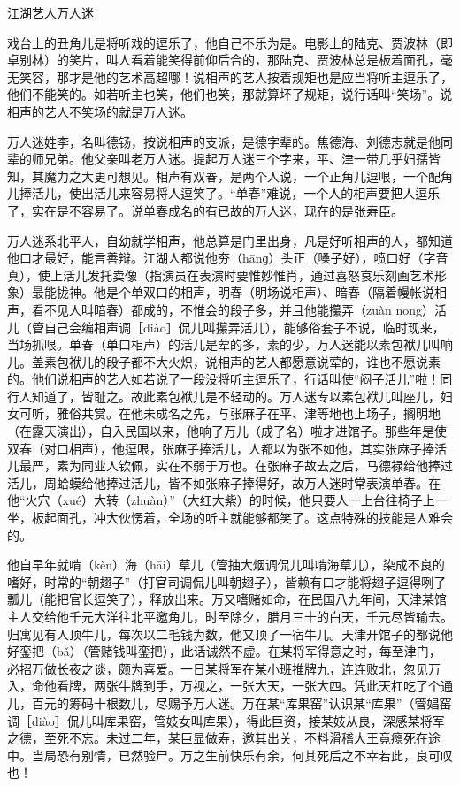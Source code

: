 \documentclass[12pt,UTF8]{ctexbook}
\begin{document}
江湖艺人万人迷


戏台上的丑角儿是将听戏的逗乐了，他自己不乐为是。电影上的陆克、贾波林（即卓别林）的笑片，叫人看着能笑得前仰后合的，那陆克、贾波林总是板着面孔，毫无笑容，那才是他的艺术高超哪！说相声的艺人按着规矩也是应当将听主逗乐了，他们不能笑的。如若听主也笑，他们也笑，那就算坏了规矩，说行话叫“笑场”。说相声的艺人不笑场的就是万人迷。

万人迷姓李，名叫德钖，按说相声的支派，是德字辈的。焦德海、刘德志就是他同辈的师兄弟。他父亲叫老万人迷。提起万人迷三个字来，平、津一带几乎妇孺皆知，其魔力之大更可想见。相声有双春，是两个人说，一个正角儿逗哏，一个配角儿捧活儿，使出活儿来容易将人逗笑了。“单春”难说，一个人的相声要把人逗乐了，实在是不容易了。说单春成名的有已故的万人迷，现在的是张寿臣。

万人迷系北平人，自幼就学相声，他总算是门里出身，凡是好听相声的人，都知道他口才最好，能言善辩。江湖人都说他夯（hānɡ）头正（嗓子好），喷口好（字音真），使上活儿发托卖像（指演员在表演时要惟妙惟肖，通过喜怒哀乐刻画艺术形象）最能拢神。他是个单双口的相声，明春（明场说相声）、暗春（隔着幔帐说相声，看不见人叫暗春）都成的，不惟会的段子多，并且他能攥弄（zuàn nong）活儿（管自己会编相声调［diào］侃儿叫攥弄活儿），能够俗套子不说，临时现来，当场抓哏。单春（单口相声）的活儿是荤的多，素的少，万人迷能以素包袱儿叫响儿。盖素包袱儿的段子都不大火炽，说相声的艺人都愿意说荤的，谁也不愿说素的。他们说相声的艺人如若说了一段没将听主逗乐了，行话叫使“闷子活儿”啦！同行人知道了，皆耻之。故此素包袱儿是不轻动的。万人迷专以素包袱儿叫座儿，妇女可听，雅俗共赏。在他未成名之先，与张麻子在平、津等地也上场子，搁明地（在露天演出），自入民国以来，他响了万儿（成了名）啦才进馆子。那些年是使双春（对口相声），他逗哏，张麻子捧活儿，人都以为张不如他，其实张麻子捧活儿最严，素为同业人钦佩，实在不弱于万也。在张麻子故去之后，马德禄给他捧过活儿，周蛤蟆给他捧过活儿，皆不如张麻子捧得好，故万人迷时常表演单春。在他“火穴（xué）大转（zhuàn）”（大红大紫）的时候，他只要人一上台往椅子上一坐，板起面孔，冲大伙愣着，全场的听主就能够都笑了。这点特殊的技能是人难会的。

他自早年就啃（kèn）海（hāi）草儿（管抽大烟调侃儿叫啃海草儿），染成不良的嗜好，时常的“朝翅子”（打官司调侃儿叫朝翅子），皆赖有口才能将翅子逗得咧了瓢儿（能把官长逗笑了），释放出来。万又嗜赌如命，在民国八九年间，天津某馆主人交给他千元大洋往北平邀角儿，时至除夕，腊月三十的白天，千元尽皆输去。归寓见有人顶牛儿，每次以二毛钱为数，他又顶了一宿牛儿。天津开馆子的都说他好銮把（bǎ）（管赌钱叫銮把），此话诚然不虚。在某将军得意之时，每至津门，必招万做长夜之谈，颇为喜爱。一日某将军在某小班推牌九，连连败北，忽见万入，命他看牌，两张牛牌到手，万视之，一张大天，一张大四。凭此天杠吃了个通儿，百元的筹码十根数儿，尽赐予万人迷。万在某“库果窑”认识某“库果”（管娼窑调［diào］侃儿叫库果窑，管妓女叫库果），得此巨资，接某妓从良，深感某将军之德，至死不忘。未过二年，某巨显做寿，邀其出关，不料滑稽大王竟瘾死在途中。当局恐有别情，已然验尸。万之生前快乐有余，何其死后之不幸若此，良可叹也！
\end{document}
